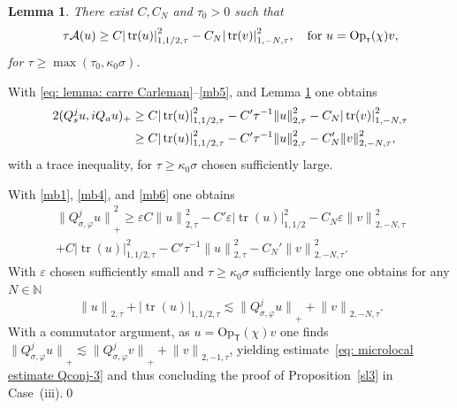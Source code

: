 \documentclass[JEP,XML,SOM,Unicode,published]{cedram}
\theoremstyle{plain}
\newtheorem{lemma}[theorem]{Lemma}
\theoremstyle{definition}
\def\N{\mathbb{N}}
\newcommand{\suff}{sufficiently\xspace}
\let\k\kappa
\let \Re \relax
\DeclareMathOperator{\Re}{Re}
\newcommand{\inp}[2]{(#1, #2)}
\newcommand{\Opt}{\ensuremath{\mathrm{Op}_{\scriptscriptstyle{\mathsf{T}}}}}
\newcommand{\Norm}[2]{{\| #1 \|}_{#2}}
\newcommand{\norm}[2]{{|#1|}_{#2}}
\newcommand{\Normsc}[2]{{\| #1 \|}_{#2, \tau}}
\newcommand{\normsc}[2]{{| #1 |}_{#2, \tau}}
\newcommand{\Qconj}{Q_{\sigma,\varphi}}
\newcommand{\Qs}{Q_{s}}
\newcommand{\Qa}{Q_{a}}
\DeclareMathOperator{\trace}{tr}
\begin{document}
\begin{lemma}\label{sl4}
There exist $C, C_N$ and $\tau_{0}>0$ such that
\begin{equation*}
\tau \Re\mathcal{A}(u)
\geq C \normsc{\trace (u)}{1,1/2}^2
-C_N \normsc{\trace(v)}{1,-N}^2,
\quad \text{for}\ u = \Opt(\chi)v,
\end{equation*}
for $\tau\geq \max(\tau_0, \k_0\sigma)$.
\end{lemma}
With \eqref{eq: lemma: carre Carleman}--\eqref{mb5}, and
Lemma \ref{sl4} one obtains
\begin{align}\label{mb6}\notag
2\Re \inp{\Qs^ju}{i\Qa u}_+
&\geq C \normsc{\trace (u)}{1,1/2}^2
- C' \tau^{-1} \Normsc{u}{2}^2
- C_N \normsc{\trace(v)}{1,-N}^2\\
&\geq C \normsc{\trace (u)}{1,1/2}^2
- C' \tau^{-1} \Normsc{u}{2}^2
- C_N' \Normsc{v}{2,-N}^2,
\end{align}
with a trace inequality, for $\tau \geq \k_0 \sigma$ chosen \suff large.

With \eqref{mb1}, \eqref{mb4}, and \eqref{mb6} one obtains
\begin{multline*}
\Norm{\Qconj^ju}{+}^2 \geq
\varepsilon C\Normsc{u}{2}^2
-C'\varepsilon \norm{\trace(u)}{1,1/2}^2
-C_N\varepsilon\Normsc{v}{2,-N}^2\\
 + C \normsc{\trace (u)}{1,1/2}^2
- C' \tau^{-1} \Normsc{u}{2}^2
- C_N' \Normsc{v}{2,-N}^2.
\end{multline*}
With $\varepsilon$ chosen \suff small and $\tau \geq \k_0 \sigma$
\suff large one obtains for any $N\in\N$
\begin{equation*}
\Normsc{u}{2} + \normsc{\trace (u)}{1,1/2}
\lesssim \Norm{\Qconj^ju}{+} +\Normsc{v}{2,-N}.
\end{equation*}
With a commutator argument, as $u=\Opt(\chi)v$ one finds
$ \Norm{\Qconj^ju}{+} \lesssim
\Norm{\Qconj^j v}{+} +\Normsc{v}{2,-1}
$, yielding estimate~\eqref{eq: microlocal estimate Qconj-3}
and thus concluding the proof of Proposition~\ref{sl3} in Case~(iii).\qed
\end{document}
